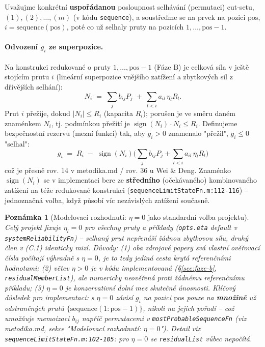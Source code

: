 \documentclass[11pt,a4paper]{article}
\newtheorem{remark}{Poznámka}
\newcommand{\code}[1]{\texttt{#1}}
\begin{document}
Uvažujme konkrétní \textbf{uspořádanou} posloupnost selhávání (permutaci) cut-setu,
$(1),(2),\dots,(m)$ (v kódu \code{sequence}), a soustřeďme se na prvek na pozici $\mathrm{pos}$,
$i=\mathrm{sequence}(\mathrm{pos})$, poté co už selhaly pruty na pozicích $1,\dots,\mathrm{pos}{-}1$.

\paragraph{Odvození $g_i$ ze superpozice.} Na konstrukci redukované o pruty $1,\dots,\mathrm{pos}{-}1$
(Fáze B) je celková síla v ještě stojícím prutu $i$ (lineární superpozice vnějšího zatížení a
zbytkových sil z dřívějších selhání):
\[
  N_i \;=\; \sum_j b_{ij} P_j \;+\; \sum_{l<i} a_{il}\,\eta_l R_l.
\]
Prut $i$ přežije, dokud $|N_i| \le R_i$ (kapacita $R_i$); porušen je ve směru daném znaménkem $N_i$, tj.
podmínkou přežití je $\operatorname{sign}(N_i)\cdot N_i \le R_i$. Definujeme bezpečnostní rezervu (mezní
funkci) tak, aby $g_i>0$ znamenalo "přežil", $g_i\le0$ "selhal":
\[
  \boxed{\;g_i \;=\; R_i \;-\; \operatorname{sign}(N_i)\Big(\sum_j b_{ij}P_j + \sum_{l<i} a_{il}\,\eta_l R_l\Big)\;}
  \tag{C.1}
\]
což je přesně rov. 14 v metodika.md / rov. 36 u Wei \& Deng. Znaménko $\operatorname{sign}(N_i)$ se v
implementaci bere ze \textbf{středního} (očekávaného) kombinovaného zatížení na téže redukované
konstrukci (\code{sequenceLimitStateFn.m:112-116}) -- jednoznačná volba, když působí víc nezávislých
zatížení současně.

\begin{remark}[Modelovací rozhodnutí: $\eta=0$ jako standardní volba projektu]
\label{rem:eta-zero}
Celý projekt fixuje $\eta_l=0$ pro všechny pruty a příklady (\code{opts.eta} default v
\code{systemReliabilityFn}) -- selhaný prut nepřenáší žádnou zbytkovou sílu, druhý člen v (C.1)
identicky mizí. Důvody: (1) oba zdrojové papery svá vlastní ověřovací čísla počítají výhradně s
$\eta=0$, je to tedy jediná cesta krytá referenčními hodnotami; (2) větev $\eta>0$ je v kódu
implementovaná (\S\ref{sec:faze-b}, \code{residualMemberList}), ale numericky neověřená proti žádnému
referenčnímu příkladu; (3) $\eta=0$ je konzervativní dolní mez skutečné únosnosti. Klíčový důsledek
pro implementaci: s $\eta=0$ závisí $g_i$ na pozici $\mathrm{pos}$ pouze na \textbf{množině} už
odstraněných prutů $\{\mathrm{sequence}(1{:}\mathrm{pos}{-}1)\}$, nikoli na jejich pořadí -- což
umožňuje memoizaci $b_{ij}$ napříč permutacemi v \code{mostProbableSequenceFn} (viz metodika.md,
sekce "Modelovací rozhodnutí: $\eta=0$"). Detail viz \code{sequenceLimitStateFn.m:102-105}: pro
$\eta=0$ se \code{residualList} vůbec nepočítá.
\end{remark}
\end{document}
